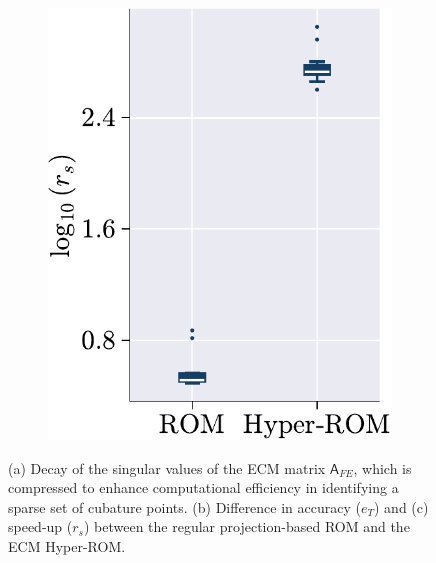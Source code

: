 \documentclass[11pt]{article}
\newcommand{\mat}[1]{\mathsf{#1}}
\begin{document}
\begin{figure}[t!]
\begin{subfigure}[b]{0.33\linewidth}
\includegraphics[height=1.3\linewidth]{speed_up_comp_rom_hrom_ecm.pdf}
\caption{}
\label{fig:HROM_ERROR_SPDUP__ecm_b}
\end{subfigure}
\caption{(a) Decay of the singular values of the ECM matrix \(\mat{A}_{FE}\), which is compressed to enhance computational efficiency in identifying a sparse set of cubature points. (b) Difference in accuracy (\(e_T\)) and (c) speed-up (\(r_s\)) between the regular projection-based ROM and the ECM Hyper-ROM.}
\label{fig:HROM_ERROR_SPDUP_ecm}
\end{figure}
\end{document}
